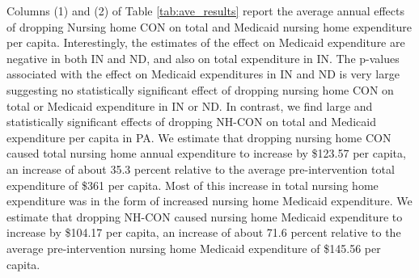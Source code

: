 \documentclass[../Main.tex]{subfiles}
\begin{document}
\indent Columns (1) and (2) of Table \ref{tab:ave_results} report the average annual effects of dropping Nursing home CON on total and Medicaid nursing home expenditure per capita. Interestingly, the estimates of the effect on Medicaid expenditure are negative in both IN and ND, and also on total expenditure in IN. The p-values associated with the effect on Medicaid expenditures in IN and ND is very large suggesting no statistically significant effect of dropping nursing home CON on total or Medicaid expenditure in IN or ND. In contrast, we find large and statistically significant effects of dropping NH-CON on total and Medicaid expenditure per capita in PA. We estimate that dropping nursing home CON caused total nursing home annual expenditure to increase by \$123.57 per capita, an increase of about 35.3 percent relative to the average pre-intervention total expenditure of \$361 per capita. Most of this increase in total nursing home expenditure was in the form of increased nursing home Medicaid expenditure. We estimate that dropping NH-CON caused nursing home Medicaid expenditure to increase by \$104.17 per capita, an increase of about 71.6 percent relative to the average pre-intervention nursing home Medicaid expenditure of \$145.56 per capita.
\end{document}
